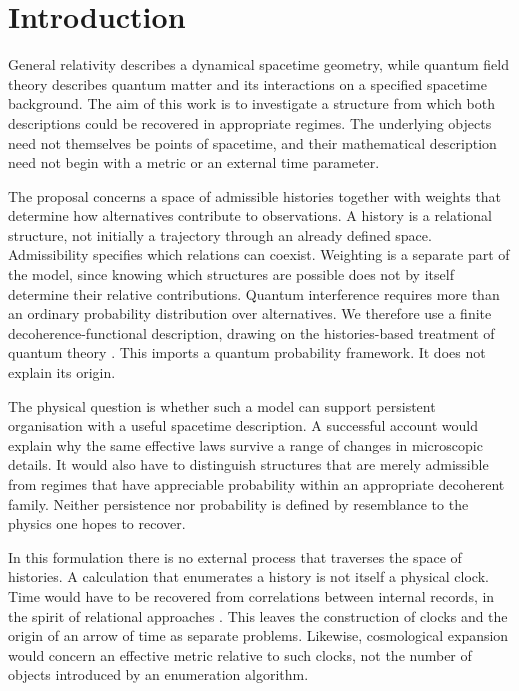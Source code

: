 \section{Introduction}
\label{sec:introduction}

General relativity describes a dynamical spacetime geometry, while quantum
field theory describes quantum matter and its interactions on a specified
spacetime background. The aim of this work is to investigate a structure
from which both descriptions could be recovered in appropriate regimes.
The underlying objects need not themselves be points of spacetime, and
their mathematical description need not begin with a metric or an external
time parameter.

The proposal concerns a space of admissible histories together with weights
that determine how alternatives contribute to observations. A history is a
relational structure, not initially a trajectory through an already defined
space. Admissibility specifies which relations can coexist. Weighting is a
separate part of the model, since knowing which structures are possible does
not by itself determine their relative contributions. Quantum interference
requires more than an ordinary probability distribution over alternatives.
We therefore use a finite decoherence-functional description, drawing on
the histories-based treatment of quantum theory \citep{sorkin1994quantummeasure}.
This imports a quantum probability framework. It does not explain its origin.

The physical question is whether such a model can support persistent
organisation with a useful spacetime description. A successful account
would explain why the same effective laws survive a range of changes in
microscopic details. It would also have to distinguish structures that are
merely admissible from regimes that have appreciable probability within an
appropriate decoherent family. Neither persistence nor probability is
defined by resemblance to the physics one hopes to recover.

In this formulation there is no external process that traverses the space
of histories. A calculation that enumerates a history is not itself a
physical clock. Time would have to be recovered from correlations between
internal records, in the spirit of relational approaches
\citep{page1983}. This leaves the construction of clocks and the origin of
an arrow of time as separate problems. Likewise, cosmological expansion
would concern an effective metric relative to such clocks, not the number
of objects introduced by an enumeration algorithm.

